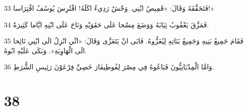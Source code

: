 \par 33 فَتَحَقَّقَهُ وَقَالَ: «قَمِيصُ ابْنِي. وَحْشٌ رَدِيءٌ اكَلَهُ! افْتُرِسَ يُوسُفُ افْتِرَاسا!»
\par 34 فَمَزَّقَ يَعْقُوبُ ثِيَابَهُ وَوَضَعَ مِسْحا عَلَى حَقَوَيْهِ وَنَاحَ عَلَى ابْنِهِ ايَّاما كَثِيرَةً.
\par 35 فَقَامَ جَمِيعُ بَنِيهِ وَجَمِيعُ بَنَاتِهِ لِيُعَزُّوهُ. فَابَى انْ يَتَعَزَّى وَقَالَ: «انِّي انْزِلُ الَى ابْنِي نَائِحا الَى الْهَاوِيَةِ». وَبَكَى عَلَيْهِ ابُوهُ.
\par 36 وَامَّا الْمِدْيَانِيُّونَ فَبَاعُوهُ فِي مِصْرَ لِفُوطِيفَارَ خَصِيِّ فِرْعَوْنَ رَئِيسِ الشُّرَطِ.

\chapter{38}


